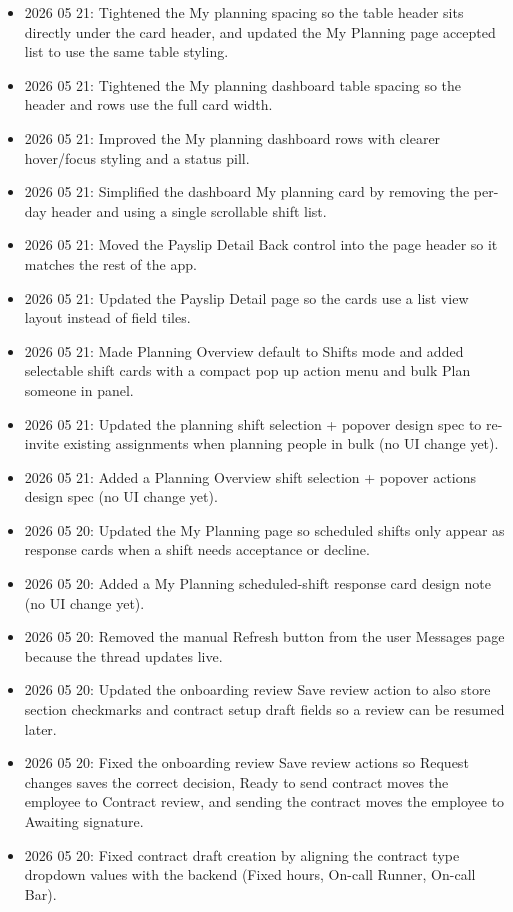 \documentclass[11pt]{article}
\begin{document}
\begin{itemize}
    \item 2026 05 21: Tightened the My planning spacing so the table header sits directly under the card header, and updated the My Planning page accepted list to use the same table styling.
    \item 2026 05 21: Tightened the My planning dashboard table spacing so the header and rows use the full card width.
    \item 2026 05 21: Improved the My planning dashboard rows with clearer hover/focus styling and a status pill.
    \item 2026 05 21: Simplified the dashboard My planning card by removing the per-day header and using a single scrollable shift list.
    \item 2026 05 21: Moved the Payslip Detail Back control into the page header so it matches the rest of the app.
    \item 2026 05 21: Updated the Payslip Detail page so the cards use a list view layout instead of field tiles.
    \item 2026 05 21: Made Planning Overview default to Shifts mode and added selectable shift cards with a compact pop up action menu and bulk Plan someone in panel.
    \item 2026 05 21: Updated the planning shift selection + popover design spec to re-invite existing assignments when planning people in bulk (no UI change yet).
    \item 2026 05 21: Added a Planning Overview shift selection + popover actions design spec (no UI change yet).
    \item 2026 05 20: Updated the My Planning page so scheduled shifts only appear as response cards when a shift needs acceptance or decline.
    \item 2026 05 20: Added a My Planning scheduled-shift response card design note (no UI change yet).
    \item 2026 05 20: Removed the manual Refresh button from the user Messages page because the thread updates live.
    \item 2026 05 20: Updated the onboarding review Save review action to also store section checkmarks and contract setup draft fields so a review can be resumed later.
    \item 2026 05 20: Fixed the onboarding review Save review actions so Request changes saves the correct decision, Ready to send contract moves the employee to Contract review, and sending the contract moves the employee to Awaiting signature.
    \item 2026 05 20: Fixed contract draft creation by aligning the contract type dropdown values with the backend (Fixed hours, On-call Runner, On-call Bar).

\end{itemize}
\end{document}
